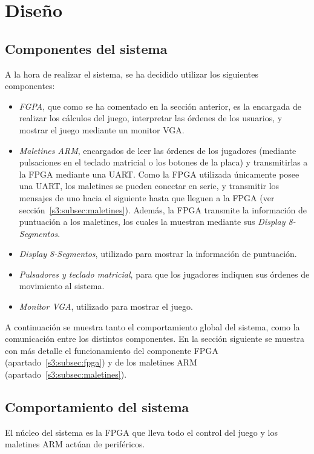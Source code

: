 \section{Diseño}
\label{s2:sec:Disenyo}

\subsection{Componentes del sistema}
\label{s2:subsec:sistema-entero}
A la hora de realizar el sistema, se ha decidido utilizar los siguientes
componentes:
\begin{itemize}
\item \emph{FGPA}, que como se ha comentado en la sección anterior, es la
  encargada de realizar los cálculos del juego, interpretar las órdenes de
  los usuarios, y mostrar el juego mediante un monitor VGA.
\item \emph{Maletines ARM}, encargados de leer las órdenes de los
  jugadores (mediante pulsaciones en el teclado matricial o los botones de
  la placa) y transmitirlas a la FPGA mediante una UART. Como la FPGA
  utilizada únicamente posee una UART, los maletines se pueden conectar en
  serie, y transmitir los mensajes de uno hacia el siguiente hasta que
  lleguen a la FPGA (ver sección~\ref{s3:subsec:maletines}). Además, la
  FPGA transmite la información de puntuación a los maletines, los cuales
  la muestran mediante sus \emph{Display 8-Segmentos}.
\item \emph{Display 8-Segmentos}, utilizado para mostrar la información de
  puntuación.
\item \emph{Pulsadores y teclado matricial}, para que los jugadores
  indiquen sus órdenes de movimiento al sistema.
\item \emph{Monitor VGA}, utilizado para mostrar el juego.
\end{itemize}

A continuación se muestra tanto el comportamiento global del sistema, como
la comunicación entre los distintos componentes. En la sección siguiente
se muestra con más detalle el funcionamiento del componente FPGA
(apartado~\ref{s3:subsec:fpga}) y de los maletines ARM
(apartado~\ref{s3:subsec:maletines}).

\subsection{Comportamiento del sistema}
\label{s2:subsec:comportamiento}
El núcleo del sistema es la FPGA que lleva todo el control del juego y
los maletines ARM actúan de periféricos. 

